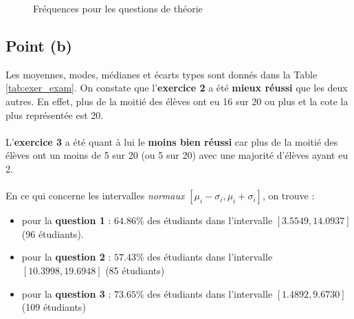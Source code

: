 \documentclass[a4paper,11pt]{article}
\begin{document}
\begin{figure}[h]
	\caption{Fréquences pour les questions de théorie}
\end{figure}

\subsection{Point (b)} 
Les moyennes, modes, médianes et écarts types sont donnés dans la Table \ref{tab:exer_exam}. On constate que l'\textbf{exercice 2} a été \textbf{mieux réussi} que les deux autres. En effet, plus de la moitié des élèves ont eu 16 sur 20 ou plus et la cote la plus représentée est 20.
\paragraph{}
L'\textbf{exercice 3} a été quant à lui le \textbf{moins bien réussi} car plus de la moitié des élèves ont un moins de 5 sur 20 (ou 5 sur 20) avec une majorité d'élèves ayant eu 2.
\paragraph{}
En ce qui concerne les intervalles \textit{normaux} $[\mu_i - \sigma_i, \mu_i + \sigma_i]$, on trouve : 
\begin{itemize}
	\item pour la \textbf{question 1} : $64.86$\% des étudiants dans 	l'intervalle $[3.5549, 14.0937]$ (96 étudiants).
	\item pour la \textbf{question 2} : $57.43$\% des étudiants dans 	l'intervalle $[10.3998, 19.6948]$ (85 étudiants) 
	\item pour la \textbf{question 3} : $73.65$\% des étudiants dans 	l'intervalle $[1.4892, 9.6730]$ (109 étudiants)
\end{itemize} 
\end{document}
